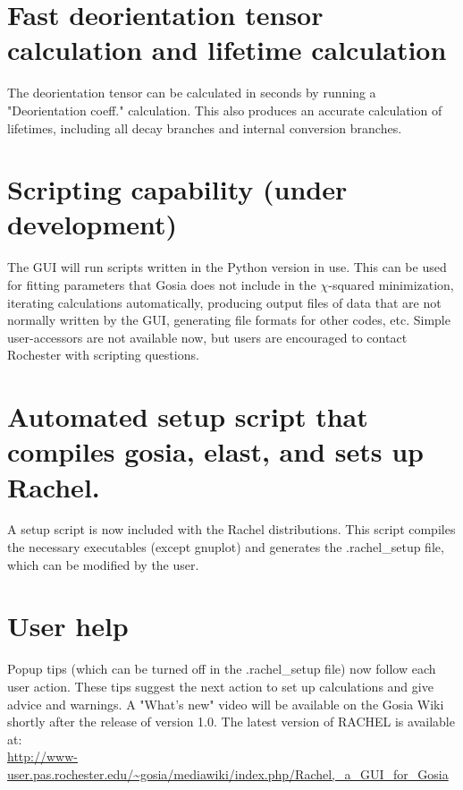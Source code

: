 \documentclass[10pt]{article}
\begin{document}
\section*{Fast deorientation tensor calculation and lifetime calculation}
The deorientation tensor can be calculated in seconds by running a "Deorientation coeff." calculation. This also produces an accurate calculation of lifetimes, including all decay branches and internal conversion branches.

\section*{Scripting capability (under development)}
The GUI will run scripts written in the Python version in use. This can be used for fitting parameters that Gosia does not include in the $\chi$-squared minimization, iterating calculations automatically, producing output files of data that are not normally written by the GUI, generating file formats for other codes, etc. Simple user-accessors are not available now, but users are encouraged to contact Rochester with scripting questions.

\section*{Automated setup script that compiles gosia, elast, and sets up Rachel.}
A setup script is now included with the Rachel distributions. This script compiles the necessary executables (except gnuplot) and generates the .rachel\_setup file, which can be modified by the user.

\section*{User help}
Popup tips (which can be turned off in the .rachel\_setup file) now follow each user action. These tips suggest the next action to set up calculations and give advice and warnings. A "What's new" video will be available on the Gosia Wiki shortly after the release of version 1.0. The latest version of RACHEL is available at:\\
\href{http://www-user.pas.rochester.edu/~gosia/mediawiki/index.php/Rachel,_a_GUI_for_Gosia}{http://www-user.pas.rochester.edu/\~{}gosia/mediawiki/index.php/Rachel,\_a\_GUI\_for\_Gosia}
\end{document}

